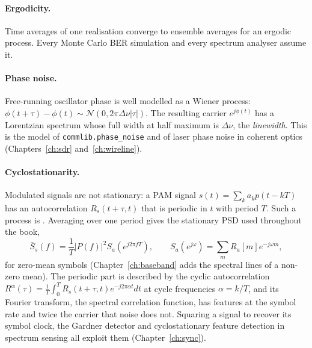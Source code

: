 \paragraph{Ergodicity.} Time averages of one realisation converge to ensemble averages for an
ergodic process. Every Monte Carlo BER simulation and every spectrum analyser assume it.

\paragraph{Phase noise.} Free-running oscillator phase is well modelled as a Wiener process:
$\phi(t+\tau)-\phi(t)\sim\mathcal N(0,2\pi\Delta\nu|\tau|)$. The resulting carrier
$e^{j\phi(t)}$ has a Lorentzian spectrum whose full width at half maximum is $\Delta\nu$, the
\emph{linewidth}. This is the model of \texttt{commlib.phase\_noise} and of laser phase noise in
coherent optics (Chapters~\ref{ch:sdr} and~\ref{ch:wireline}).


\paragraph{Cyclostationarity.} Modulated signals are not stationary: a PAM signal
$s(t)=\sum_ka_kp(t-kT)$ has an autocorrelation $R_s(t+\tau,t)$ that is periodic in $t$ with
period $T$. Such a process is . Averaging over one period gives the
stationary PSD used throughout the book,
\begin{equation}
\bar S_s(f)=\frac1T|P(f)|^2S_a(e^{j2\pi fT}),\qquad S_a(e^{j\omega})=\sum_mR_a[m]e^{-j\omega m},
\label{eq:appA:pampsd}
\end{equation}
for zero-mean symbols (Chapter~\ref{ch:baseband} adds the spectral lines of a non-zero mean). The
periodic part is described by the cyclic autocorrelation
$R^\alpha(\tau)=\frac1T\int_0^TR_s(t+\tau,t)e^{-j2\pi\alpha t}dt$ at cycle frequencies
$\alpha=k/T$, and its Fourier transform, the spectral correlation function, has features at the
symbol rate and twice the carrier that noise does not. Squaring a signal to recover its symbol
clock, the Gardner detector and cyclostationary feature detection in spectrum sensing all
exploit them (Chapter~\ref{ch:sync}).

